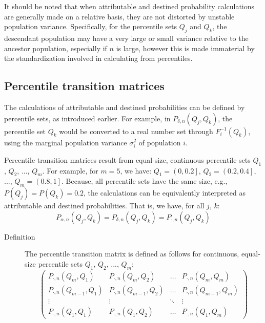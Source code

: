 \documentclass[a4paper,11pt]{article} %
\begin{document}
It should be noted that when attributable and destined probability calculations are generally made on a relative basis, they are not distorted by unstable population variance. Specifically, for the percentile sets $Q_j$ and $Q_k$, the descendant population may have a very large or small variance relative to the ancestor population, especially if $n$ is large, however this is made immaterial by the standardization involved in calculating from percentiles.

\subsection{Percentile transition matrices}

The calculations of attributable and destined probabilities can be defined by percentile sets, as introduced earlier. For example, in $P_{\delta , n}(Q_j, Q_k)$, the percentile set $Q_k$ would be converted to a real number set through $F_i^{-1}(Q_k)$, using the marginal population variance $\sigma_i^2$ of population $i$. 

Percentile transition matrices result from equal-size, continuous percentile sets $Q_1$, $Q_2$, ..., $Q_m$. For example, for $m=5$, we have: $Q_1 = \left(0, 0.2\right]$, $Q_2 = \left(0.2, 0.4\right]$, ..., $Q_m = \left(0.8, 1\right]$. Because, all percentile sets have the same size, e.g., $P(Q_j) = P(Q_k) = 0.2$, the calculations can be equivalently interpreted as attributable and destined probabilities. That is, we have, for all $j$, $k$:
$$P_{\alpha , n}(Q_j, Q_k) = P_{\delta , n}(Q_j, Q_k) = P_{\cdot , n}(Q_j, Q_k)$$

\begin{description}
\item [Definition] The percentile transition matrix is defined as follows for continuous, equal-size percentile sets $Q_1$, $Q_2$, ..., $Q_m$:
 $$
\begin{pmatrix}
P_{\cdot , n}(Q_m, Q_1) &  P_{\cdot , n}(Q_m, Q_2)  & \ldots & P_{\cdot , n}(Q_m, Q_m)\\
P_{\cdot , n}(Q_{m-1}, Q_1)  &  P_{\cdot , n}(Q_{m-1}, Q_2) & \ldots & P_{\cdot , n}(Q_{m-1}, Q_m)\\
\vdots & \vdots & \ddots & \vdots\\
P_{\cdot , n}(Q_1, Q_1)  &   P_{\cdot , n}(Q_1, Q_2)       &\ldots & P_{\cdot , n}(Q_1, Q_m)
\end{pmatrix}
$$
\end{description}
 
\end{document}
